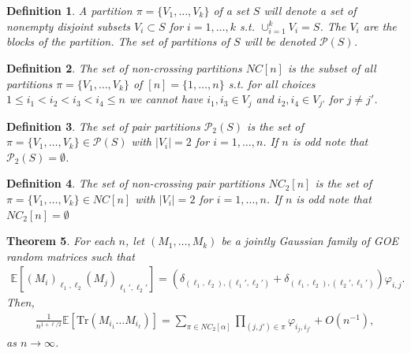 \documentclass{amsart}
\newtheorem{thm}{Theorem}[section]
\newtheorem{defn}[thm]{Definition}
\numberwithin{equation}{section}
\newcommand{\E}{\mathbb{E}}
\begin{document}
\begin{defn}
    A \textit{partition} $\pi = \{V_1,\dots ,V_k\}$ of a set $S$ will denote a set of nonempty disjoint subsets $V_i \subset S$ for $i=1,\dots ,k$ s.t. $\cup_{i=1}^{k} V_i = S$. The $V_i$ are the \textit{blocks} of the partition. The set of partitions of $S$ will be denoted $\mathcal{P}(S)$.
\end{defn}

\begin{defn}
    The set of non-crossing partitions $NC[n]$ is the subset of all partitions $\pi = \{V_1,\dots ,V_k\}$ of $[n]=\{1,\dots ,n\}$ s.t. for all choices $1\leq i_1<i_2<i_3< i_4 \leq n$ we cannot have $i_1,i_3 \in V_j$ and $i_2,i_4 \in V_{j'}$ for $j \neq j'$.
\end{defn}

\begin{defn}
    The set of  pair partitions $\mathcal{P}_2(S)$ is the set of $\pi=\{V_1,\dots ,V_k\} \in \mathcal{P}(S)$ with $|V_i|=2$ for $i=1,\dots ,n$. If $n$ is odd note that $\mathcal{P}_2(S) = \emptyset$.
\end{defn}

\begin{defn}
    The set of non-crossing pair partitions $NC_2[n]$ is the set of $\pi=\{V_1,\dots,V_k\} \in NC[n]$ with $|V_i|=2$ for $i=1,\dots,n$. If $n$ is odd note that $NC_2[n] = \emptyset$
\end{defn}

\begin{thm}\label{Semicircular system asymptotics}
    For each $n$, let $(M_1,\dots,M_k)$ be a jointly Gaussian family of GOE random matrices such that
    \begin{equation}
        \begin{split}
            \E\left[(M_i)_{\ell_1,\ell_2} (M_j)_{\ell_1',\ell_2'}\right]= \left(\delta_{(\ell_1,\ell_2),(\ell_1',\ell_2')}+\delta_{(\ell_1,\ell_2),(\ell_2',\ell_1')}\right) \varphi_{i,j}.
        \end{split}
    \end{equation}
    Then,
    \begin{equation}
        \begin{split}
            \frac{1}{n^{1+\ell/2}}\E\left[\mathrm{Tr}(M_{i_1}\dots M_{i_{\ell}})\right] = \sum_{\pi \in NC_2[\alpha]} \prod_{(j,j') \in \pi} \varphi_{i_j,i_{j'}}+O(n^{-1}),
        \end{split}
    \end{equation}
    as $n \to \infty$.
\end{thm}
\end{document}
